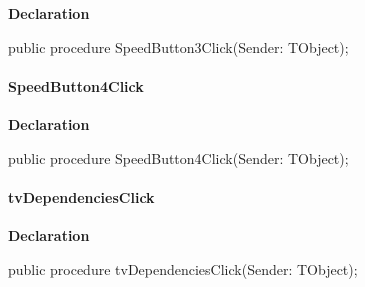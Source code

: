 \documentclass{report}
\newif\ifpdf
\begin{document}
\label{prjwizard.TfrmProjectWizard-SpeedButton3Click}
\begin{list}{}{
\setlength{\itemindent}{0cm}
\setlength{\listparindent}{0cm}
\setlength{\leftmargin}{\evensidemargin}
\addtolength{\leftmargin}{\tmplength}
\settowidth{\labelsep}{X}
\addtolength{\leftmargin}{\labelsep}
\setlength{\labelwidth}{\tmplength}
}
\item[\textbf{Declaration}\hfill]
\ifpdf
\begin{flushleft}
\fi
\begin{ttfamily}
public procedure SpeedButton3Click(Sender: TObject);\end{ttfamily}

\ifpdf
\end{flushleft}
\fi

\end{list}
\paragraph*{SpeedButton4Click}\hspace*{\fill}

\label{prjwizard.TfrmProjectWizard-SpeedButton4Click}
\begin{list}{}{
\setlength{\itemindent}{0cm}
\setlength{\listparindent}{0cm}
\setlength{\leftmargin}{\evensidemargin}
\addtolength{\leftmargin}{\tmplength}
\settowidth{\labelsep}{X}
\addtolength{\leftmargin}{\labelsep}
\setlength{\labelwidth}{\tmplength}
}
\item[\textbf{Declaration}\hfill]
\ifpdf
\begin{flushleft}
\fi
\begin{ttfamily}
public procedure SpeedButton4Click(Sender: TObject);\end{ttfamily}

\ifpdf
\end{flushleft}
\fi

\end{list}
\paragraph*{tvDependenciesClick}\hspace*{\fill}

\label{prjwizard.TfrmProjectWizard-tvDependenciesClick}
\begin{list}{}{
\setlength{\itemindent}{0cm}
\setlength{\listparindent}{0cm}
\setlength{\leftmargin}{\evensidemargin}
\addtolength{\leftmargin}{\tmplength}
\settowidth{\labelsep}{X}
\addtolength{\leftmargin}{\labelsep}
\setlength{\labelwidth}{\tmplength}
}
\item[\textbf{Declaration}\hfill]
\ifpdf
\begin{flushleft}
\fi
\begin{ttfamily}
public procedure tvDependenciesClick(Sender: TObject);\end{ttfamily}

\ifpdf
\end{flushleft}
\fi

\end{list}
\end{document}

